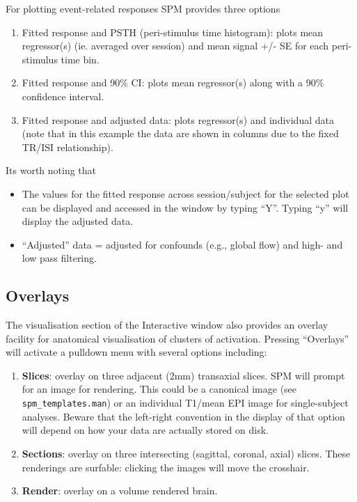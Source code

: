 For plotting event-related responses SPM provides three options

\begin{enumerate}
\item Fitted response and PSTH (peri-stimulus time histogram): plots mean regressor(s) (ie. averaged over session) and mean signal +/- SE for each peri-stimulus time bin.
\item Fitted response and 90\% CI: plots mean regressor(s) along with a 90\% confidence interval.
\item Fitted response and adjusted data: plots regressor(s) and individual data (note that in this example the data are shown in columns due to the fixed TR/ISI relationship).
\end{enumerate}

Its worth noting that

\begin{itemize}
\item The values for the fitted response across session/subject for the selected plot can be displayed and accessed in the \matlab window by typing ``Y''. Typing ``y'' will display the adjusted data.
\item ``Adjusted'' data = adjusted for confounds (e.g., global flow) and high- and low pass filtering.
\end{itemize}

\subsection{Overlays}

The visualisation section of the Interactive window also provides an overlay facility for anatomical visualisation of clusters of activation. Pressing ``Overlays'' will activate a pulldown menu with several options including:

\begin{enumerate}
\item \textbf{Slices}: overlay on three adjacent (2mm) transaxial slices. SPM will prompt for an image for rendering. This could be a canonical image (see \texttt{spm\_templates.man}) or an individual T1/mean EPI image for single-subject analyses. Beware that the left-right convention in the display of that option will depend on how your data are actually stored on disk.
\item \textbf{Sections}: overlay on three intersecting (sagittal, coronal, axial) slices. These renderings are surfable: clicking the images will move the crosshair.
\item \textbf{Render}: overlay on a volume rendered brain.
\end{enumerate}

